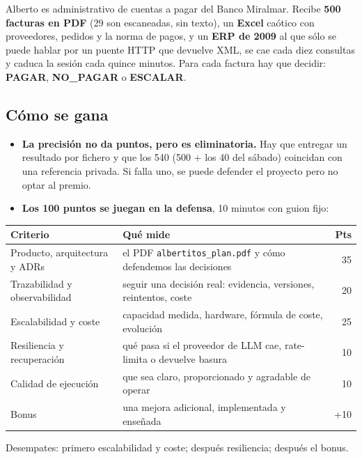 \documentclass[11pt,a4paper]{article}
\newcommand{\cmd}[1]{\texttt{\small #1}}
\begin{document}
Alberto es administrativo de cuentas a pagar del Banco Miralmar. Recibe \textbf{500 facturas en PDF} (29 son
escaneadas, sin texto), un \textbf{Excel} caótico con proveedores, pedidos y la norma de pagos, y un
\textbf{ERP de 2009} al que sólo se puede hablar por un puente HTTP que devuelve XML, se cae cada diez
consultas y caduca la sesión cada quince minutos. Para cada factura hay que decidir: \textbf{PAGAR},
\textbf{NO\_PAGAR} o \textbf{ESCALAR}.

\subsection{Cómo se gana}

\begin{itemize}
  \item \textbf{La precisión no da puntos, pero es eliminatoria.} Hay que entregar un resultado por fichero y
        que los 540 (500 + los 40 del sábado) coincidan con una referencia privada. Si falla uno, se puede
        defender el proyecto pero no optar al premio.
  \item \textbf{Los 100 puntos se juegan en la defensa}, 10 minutos con guion fijo:
\end{itemize}

\begin{center}
\begin{tabularx}{\linewidth}{lXr}
\toprule
\textbf{Criterio} & \textbf{Qué mide} & \textbf{Pts} \\
\midrule
Producto, arquitectura y ADRs & el PDF \cmd{albertitos\_plan.pdf} y cómo defendemos las decisiones & 35 \\
Trazabilidad y observabilidad & seguir una decisión real: evidencia, versiones, reintentos, coste & 20 \\
Escalabilidad y coste & capacidad medida, hardware, fórmula de coste, evolución & 25 \\
Resiliencia y recuperación & qué pasa si el proveedor de LLM cae, rate-limita o devuelve basura & 10 \\
Calidad de ejecución & que sea claro, proporcionado y agradable de operar & 10 \\
Bonus & una mejora adicional, implementada y enseñada & +10 \\
\bottomrule
\end{tabularx}
\end{center}

\noindent Desempates: primero escalabilidad y coste; después resiliencia; después el bonus.
\end{document}
